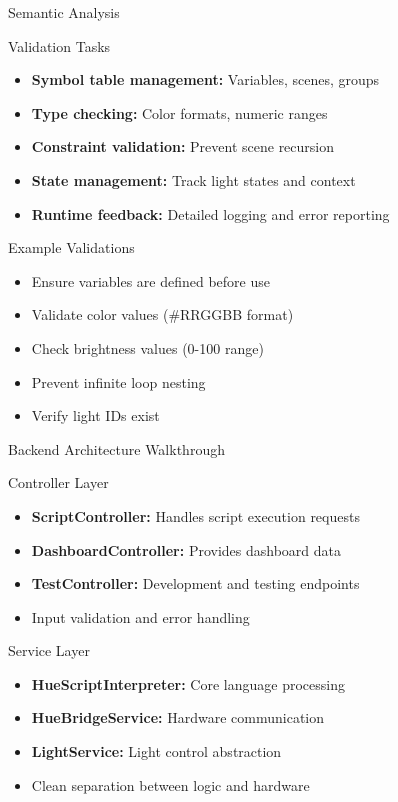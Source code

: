 \documentclass{beamer}
\begin{document}
\begin{frame}{Semantic Analysis}
\begin{block}{Validation Tasks}
\begin{itemize}
    \item \textbf{Symbol table management:} Variables, scenes, groups
    \item \textbf{Type checking:} Color formats, numeric ranges
    \item \textbf{Constraint validation:} Prevent scene recursion
    \item \textbf{State management:} Track light states and context
    \item \textbf{Runtime feedback:} Detailed logging and error reporting
\end{itemize}
\end{block}

\begin{block}{Example Validations}
\begin{itemize}
    \item Ensure variables are defined before use
    \item Validate color values (\#RRGGBB format)
    \item Check brightness values (0-100 range)
    \item Prevent infinite loop nesting
    \item Verify light IDs exist
\end{itemize}
\end{block}
\end{frame}

\begin{frame}{Backend Architecture Walkthrough}
\begin{block}{Controller Layer}
\begin{itemize}
    \item \textbf{ScriptController:} Handles script execution requests
    \item \textbf{DashboardController:} Provides dashboard data
    \item \textbf{TestController:} Development and testing endpoints
    \item Input validation and error handling
\end{itemize}
\end{block}

\begin{block}{Service Layer}
\begin{itemize}
    \item \textbf{HueScriptInterpreter:} Core language processing
    \item \textbf{HueBridgeService:} Hardware communication
    \item \textbf{LightService:} Light control abstraction
    \item Clean separation between logic and hardware
\end{itemize}
\end{block}
\end{frame}
\end{document}

